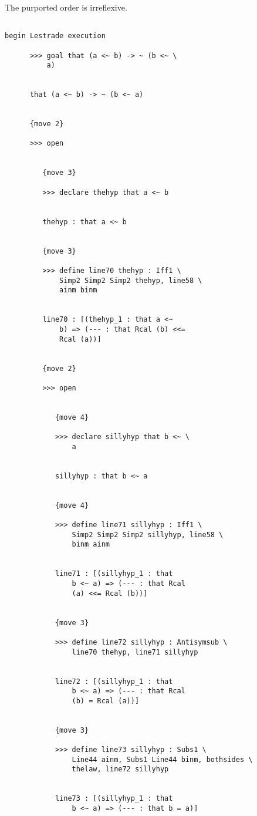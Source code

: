 \documentclass[12pt]{article}
\begin{document}
The purported order is irreflexive.

\begin{verbatim}

begin Lestrade execution

      >>> goal that (a <~ b) -> ~ (b <~ \
          a)


      that (a <~ b) -> ~ (b <~ a)


      {move 2}

      >>> open


         {move 3}

         >>> declare thehyp that a <~ b


         thehyp : that a <~ b


         {move 3}

         >>> define line70 thehyp : Iff1 \
             Simp2 Simp2 Simp2 thehyp, line58 \
             ainm binm


         line70 : [(thehyp_1 : that a <~ 
             b) => (--- : that Rcal (b) <<= 
             Rcal (a))]


         {move 2}

         >>> open


            {move 4}

            >>> declare sillyhyp that b <~ \
                a


            sillyhyp : that b <~ a


            {move 4}

            >>> define line71 sillyhyp : Iff1 \
                Simp2 Simp2 Simp2 sillyhyp, line58 \
                binm ainm


            line71 : [(sillyhyp_1 : that 
                b <~ a) => (--- : that Rcal 
                (a) <<= Rcal (b))]


            {move 3}

            >>> define line72 sillyhyp : Antisymsub \
                line70 thehyp, line71 sillyhyp


            line72 : [(sillyhyp_1 : that 
                b <~ a) => (--- : that Rcal 
                (b) = Rcal (a))]


            {move 3}

            >>> define line73 sillyhyp : Subs1 \
                Line44 ainm, Subs1 Line44 binm, bothsides \
                thelaw, line72 sillyhyp


            line73 : [(sillyhyp_1 : that 
                b <~ a) => (--- : that b = a)]



\end{verbatim}
\end{document}
